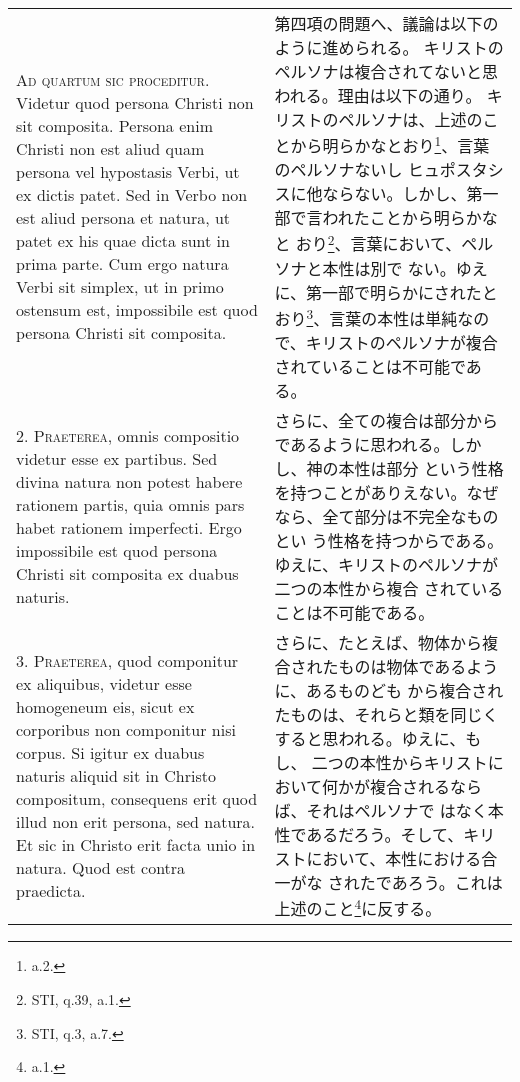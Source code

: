 \documentclass[10pt]{jsarticle} %
\begin{document}
\begin{longtable}{p{21em}p{21em}}

{\Huge A}{\scshape d quartum sic proceditur}. Videtur quod persona Christi non sit
composita. Persona enim Christi non est aliud quam persona vel
hypostasis Verbi, ut ex dictis patet. Sed in Verbo non est aliud persona
et natura, ut patet ex his quae dicta sunt in prima parte. Cum ergo
natura Verbi sit simplex, ut in primo ostensum est, impossibile est quod
persona Christi sit composita.


&

第四項の問題へ、議論は以下のように進められる。
キリストのペルソナは複合されてないと思われる。理由は以下の通り。
キリストのペルソナは、上述のことから明らかなとおり\footnote{a.2.}、言葉のペルソナないし
 ヒュポスタシスに他ならない。しかし、第一部で言われたことから明らかなと
 おり\footnote{STI, q.39, a.1.}、言葉において、ペルソナと本性は別で
 ない。ゆえに、第一部で明らかにされたとおり\footnote{STI, q.3, a.7.}、言葉の本性は単純なので、キリストのペルソナが複合されていることは不可能である。

\\



2. {\scshape Praeterea}, omnis compositio videtur esse ex partibus. Sed divina natura
non potest habere rationem partis, quia omnis pars habet rationem
imperfecti. Ergo impossibile est quod persona Christi sit composita ex
duabus naturis.


&

さらに、全ての複合は部分からであるように思われる。しかし、神の本性は部分
 という性格を持つことがありえない。なぜなら、全て部分は不完全なものとい
 う性格を持つからである。ゆえに、キリストのペルソナが二つの本性から複合
 されていることは不可能である。

\\



3. {\scshape Praeterea}, quod componitur ex aliquibus, videtur esse homogeneum eis,
sicut ex corporibus non componitur nisi corpus. Si igitur ex duabus
naturis aliquid sit in Christo compositum, consequens erit quod illud
non erit persona, sed natura. Et sic in Christo erit facta unio in
natura. Quod est contra praedicta.


&


さらに、たとえば、物体から複合されたものは物体であるように、あるものども
 から複合されたものは、それらと類を同じくすると思われる。ゆえに、もし、
 二つの本性からキリストにおいて何かが複合されるならば、それはペルソナで
 はなく本性であるだろう。そして、キリストにおいて、本性における合一がな
 されたであろう。これは上述のこと\footnote{a.1.}に反する。


\end{longtable}
\end{document}
